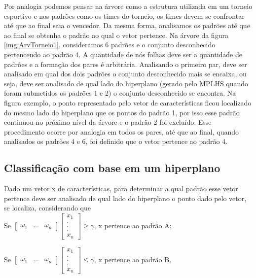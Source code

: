 Por analogia podemos pensar na árvore como a estrutura utilizada em um torneio esportivo e nos padrões como os times do torneio, os times devem se confrontar até que ao final saia o vencedor. Da mesma forma, analisamos os padrões até que ao final se obtenha o padrão ao qual o vetor pertence.
Na árvore da figura \ref{img:ArvTorneio1}, consideramos 6 padrões e o conjunto desconhecido pertencendo ao padrão 4. A quantidade de nós folhas deve ser a quantidade de padrões e a formação dos pares é arbitrária. Analisando o primeiro par, deve ser analisado em qual dos dois padrões o conjunto desconhecido mais se encaixa, ou seja, deve ser analisado de qual lado do hiperplano (gerado pelo MPLHS quando foram submetidos os padrões 1 e 2) o conjunto desconhecido se encontra. Na figura exemplo, o ponto representado pelo vetor de características ficou localizado do mesmo lado do hiperplano que os pontos do padrão 1, por isso esse padrão continuou no próximo nível da árvore e o padrão 2 foi excluído. Esse procedimento ocorre por analogia em todos os pares, até que ao final, quando analisados os padrões 4 e 6, foi definido que o vetor pertence ao padrão 4.

\subsection{Classificação com base em um hiperplano}
Dado um vetor x de características, para determinar a qual padrão esse vetor pertence deve ser analisado de qual lado do hiperplano o ponto dado pelo vetor, se localiza, considerando que 
\\Se $ \begin{bmatrix}
\omega _{1} & ... & \omega _{n} 
\end{bmatrix}
\begin{bmatrix}
x_{1}
\\ 
.
\\
. 
\\
. 
\\
x_{n}
\end{bmatrix}
\geq \gamma $, x pertence ao padrão A;

Se $ \begin{bmatrix}
\omega _{1} & ... & \omega _{n} 
\end{bmatrix}
\begin{bmatrix}
x_{1}
\\ 
.
\\
. 
\\
. 
\\
x_{n}
\end{bmatrix}
\leq  \gamma $, x pertence ao padrão B.

